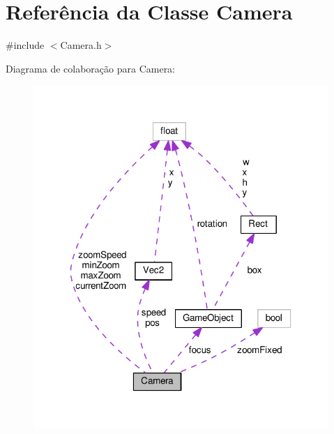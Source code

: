 \hypertarget{classCamera}{\section{Referência da Classe Camera}
\label{classCamera}
}


{\ttfamily \#include $<$Camera.\+h$>$}



Diagrama de colaboração para Camera\+:
\nopagebreak
\begin{figure}[H]
\begin{center}
\leavevmode
\includegraphics[width=317pt]{classCamera__coll__graph}
\end{center}
\end{figure}
